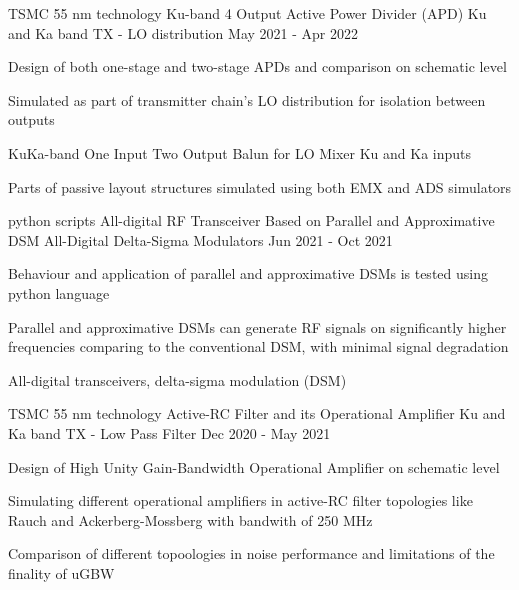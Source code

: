 \begin{cventries}

\cventry
{TSMC 55 nm technology} %
{Ku-band 4 Output Active Power Divider (APD)} %
{Ku and Ka band TX - LO distribution} %
{May 2021 - Apr 2022} %
{ %
\begin{cvitems}
    \item {Design of both one-stage and two-stage APDs and comparison on schematic level}
    \item {Simulated as part of transmitter chain's LO distribution for isolation between outputs}
    \item {KuKa-band One Input Two Output Balun for LO Mixer Ku and Ka inputs}
    \item {Parts of passive layout structures simulated using both EMX and ADS simulators}
\end{cvitems}
}


\cventry
{python scripts} %
{All-digital RF Transceiver Based on Parallel and Approximative DSM} %
{All-Digital Delta-Sigma Modulators} %
{Jun 2021 - Oct 2021} %
{ %
\begin{cvitems}
    \item {Behaviour and application of parallel and approximative DSMs is tested using python language}
    \item {Parallel and approximative DSMs can generate RF signals on significantly higher frequencies comparing to the conventional DSM, with minimal signal degradation}
    \item {All-digital transceivers, delta-sigma modulation (DSM)}
\end{cvitems}
}


\cventry
{TSMC 55 nm technology} %
{Active-RC Filter and its Operational Amplifier} %
{Ku and Ka band TX - Low Pass Filter} %
{Dec 2020 - May 2021} %
{ %
\begin{cvitems}
    \item {Design of High Unity Gain-Bandwidth Operational Amplifier on schematic level}
    \item {Simulating different operational amplifiers in active-RC filter topologies like Rauch and Ackerberg-Mossberg with bandwith of 250 MHz}
    \item {Comparison of different topoologies in noise performance and limitations of the finality of uGBW}
\end{cvitems} 
}


\end{cventries}
